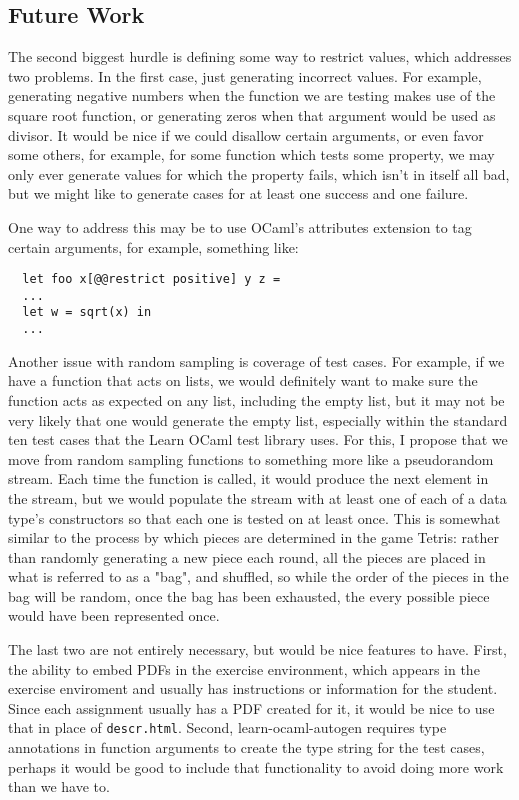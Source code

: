 \documentclass[11pt]{article}
\begin{document}
\subsection{Future Work}
The second biggest hurdle is defining some way to restrict values, which addresses two problems. In the first case, just generating incorrect values. For example, generating negative numbers when the function we are testing makes use of the square root function, or generating zeros when that argument would be used as divisor. It would be nice if we could disallow certain arguments, or even favor some others, for example, for some function which tests some property, we may only ever generate values for which the property fails, which isn't in itself all bad, but we might like to generate cases for at least one success and one failure.

One way to address this may be to use OCaml's attributes extension to tag certain arguments, for example, something like:

\begin{lstlisting}
  let foo x[@@restrict positive] y z =
  ...
  let w = sqrt(x) in
  ...
\end{lstlisting}

Another issue with random sampling is coverage of test cases. For example, if we have a function that acts on lists, we would definitely want to make sure the function acts as expected on any list, including the empty list, but it may not be very likely that one would generate the empty list, especially within the standard ten test cases that the Learn OCaml test library uses. For this, I propose that we move from random sampling functions to something more like a pseudorandom stream. Each time the function is called, it would produce the next element in the stream, but we would populate the stream with at least one of each of a data type's constructors so that each one is tested on at least once. This is somewhat similar to the process by which pieces are determined in the game Tetris: rather than randomly generating a new piece each round, all the pieces are placed in what is referred to as a "bag", and shuffled, so while the order of the pieces in the bag will be random, once the bag has been exhausted, the every possible piece would have been represented once.

The last two are not entirely necessary, but would be nice features to have. First, the ability to embed PDFs in the exercise environment, which appears in the exercise enviroment and usually has instructions or information for the student. Since each assignment usually has a PDF created for it, it would be nice to use that in place of \verb+descr.html+. Second, learn-ocaml-autogen requires type annotations in function arguments to create the type string for the test cases, perhaps it would be good to include that functionality to avoid doing more work than we have to.

{}

\end{document}
